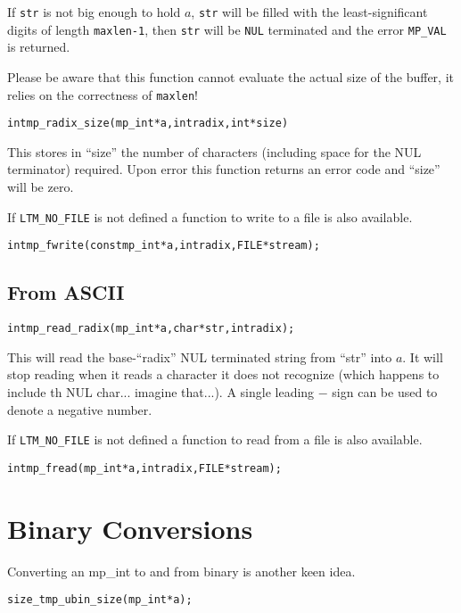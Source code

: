 \documentclass[synpaper]{book}
\begin{document}
If \texttt{str} is not big enough to hold $a$, \texttt{str} will be filled with the least-significant digits
of length \texttt{maxlen-1}, then \texttt{str} will be \texttt{NUL} terminated and the error \texttt{MP\_VAL} is returned.

Please be aware that this function cannot evaluate the actual size of the buffer, it relies on the correctness of \texttt{maxlen}!


\begin{alltt}
int mp_radix_size (mp_int * a, int radix, int *size)
\end{alltt}
This stores in ``size'' the number of characters (including space for the NUL terminator) required.  Upon error this
function returns an error code and ``size'' will be zero.

If \texttt{LTM\_NO\_FILE} is not defined a function to write to a file is also available.
\begin{alltt}
int mp_fwrite(const mp_int *a, int radix, FILE *stream);
\end{alltt}


\subsection{From ASCII}
\begin{alltt}
int mp_read_radix (mp_int * a, char *str, int radix);
\end{alltt}
This will read the base-``radix'' NUL terminated string from ``str'' into $a$.  It will stop reading when it reads a
character it does not recognize (which happens to include th NUL char... imagine that...).  A single leading $-$ sign
can be used to denote a negative number.

If \texttt{LTM\_NO\_FILE} is not defined a function to read from a file is also available.
\begin{alltt}
int mp_fread(mp_int *a, int radix, FILE *stream);
\end{alltt}


\section{Binary Conversions}

Converting an mp\_int to and from binary is another keen idea.

\begin{alltt}
size_t mp_ubin_size(mp_int *a);
\end{alltt}
\end{document}
